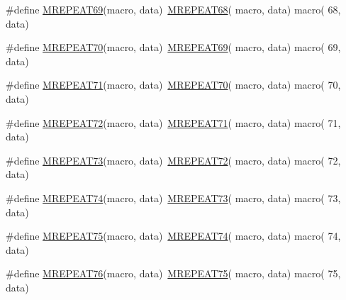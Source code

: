 \begin{DoxyCompactItemize}
\item 
\#define \mbox{\hyperlink{group__group__sam0__utils__mrepeat_gaf5b5c7b140c272560551ca6b6b37256c}{M\+R\+E\+P\+E\+A\+T69}}(macro,  data)~\mbox{\hyperlink{group__group__sam0__utils__mrepeat_ga1f925f41c5c5e044e274c24fd24f3416}{M\+R\+E\+P\+E\+A\+T68}}( macro, data)   macro( 68, data)
\item 
\#define \mbox{\hyperlink{group__group__sam0__utils__mrepeat_ga677da95097e98df0ab8d600dc490e39a}{M\+R\+E\+P\+E\+A\+T70}}(macro,  data)~\mbox{\hyperlink{group__group__sam0__utils__mrepeat_gaf5b5c7b140c272560551ca6b6b37256c}{M\+R\+E\+P\+E\+A\+T69}}( macro, data)   macro( 69, data)
\item 
\#define \mbox{\hyperlink{group__group__sam0__utils__mrepeat_ga702fd0113374ea1ce97cbc50be2332f9}{M\+R\+E\+P\+E\+A\+T71}}(macro,  data)~\mbox{\hyperlink{group__group__sam0__utils__mrepeat_ga677da95097e98df0ab8d600dc490e39a}{M\+R\+E\+P\+E\+A\+T70}}( macro, data)   macro( 70, data)
\item 
\#define \mbox{\hyperlink{group__group__sam0__utils__mrepeat_gab6f74943a635c95e80aaf53e744212fd}{M\+R\+E\+P\+E\+A\+T72}}(macro,  data)~\mbox{\hyperlink{group__group__sam0__utils__mrepeat_ga702fd0113374ea1ce97cbc50be2332f9}{M\+R\+E\+P\+E\+A\+T71}}( macro, data)   macro( 71, data)
\item 
\#define \mbox{\hyperlink{group__group__sam0__utils__mrepeat_gac9174dbacb9c007ef48316a965f67118}{M\+R\+E\+P\+E\+A\+T73}}(macro,  data)~\mbox{\hyperlink{group__group__sam0__utils__mrepeat_gab6f74943a635c95e80aaf53e744212fd}{M\+R\+E\+P\+E\+A\+T72}}( macro, data)   macro( 72, data)
\item 
\#define \mbox{\hyperlink{group__group__sam0__utils__mrepeat_ga87d76594b00b293cc7221f7de33e1a41}{M\+R\+E\+P\+E\+A\+T74}}(macro,  data)~\mbox{\hyperlink{group__group__sam0__utils__mrepeat_gac9174dbacb9c007ef48316a965f67118}{M\+R\+E\+P\+E\+A\+T73}}( macro, data)   macro( 73, data)
\item 
\#define \mbox{\hyperlink{group__group__sam0__utils__mrepeat_ga0b35f78c7db7ec7d73d5af309eb1c59c}{M\+R\+E\+P\+E\+A\+T75}}(macro,  data)~\mbox{\hyperlink{group__group__sam0__utils__mrepeat_ga87d76594b00b293cc7221f7de33e1a41}{M\+R\+E\+P\+E\+A\+T74}}( macro, data)   macro( 74, data)
\item 
\#define \mbox{\hyperlink{group__group__sam0__utils__mrepeat_ga58c5f129a638f3cad65063a67dbdcbb6}{M\+R\+E\+P\+E\+A\+T76}}(macro,  data)~\mbox{\hyperlink{group__group__sam0__utils__mrepeat_ga0b35f78c7db7ec7d73d5af309eb1c59c}{M\+R\+E\+P\+E\+A\+T75}}( macro, data)   macro( 75, data)

\end{DoxyCompactItemize}
